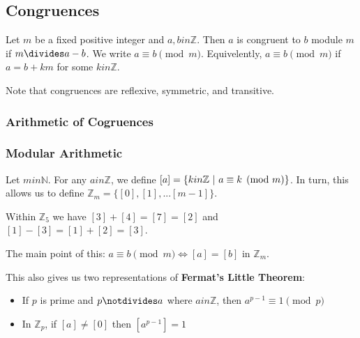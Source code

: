 \documentclass[12pt]{article}
\begin{document}


\subsection*{Congruences}
 Let $m$ be a fixed positive integer and $a,b in \mathbb{Z}$. Then $a$ is congruent to $b$ module $m$ if $m \divides a - b$. We write $a \equiv b \pmod m$. Equivelently, $a \equiv b \pmod m$ if $a = b + km$ for some $k in \mathbb{Z}$.

Note that congruences are reflexive, symmetric, and transitive.

\subsubsection*{Arithmetic of Cogruences}

\subsubsection*{Modular Arithmetic}
 Let $m in \mathbb{N}$. For any $a in \mathbb{Z}$, we define $[a] = \{ k in \mathbb{Z} \ |\  a \equiv k \pmod m \}$. In turn, this allows us to define $\mathbb{Z}_m = \{ [0], [1], ... [m-1] \}$.

Within $\mathbb{Z}_5$ we have $[3] + [4] = [7] = [2]$ and $[1] - [3] = [1] + [2] = [3]$.

The main point of this: $a \equiv b \pmod m \iff [a] = [b]$ in $\mathbb{Z}_m$.

This also gives us two representations of {\bf Fermat's Little Theorem}:
\begin{itemize}
\item If $p$ is prime and $p \notdivides a$ where $a in \mathbb{Z}$, then $a^{p-1} \equiv 1 \pmod p$
\item In $\mathbb{Z}_p$, if $[a] \neq [0]$ then $[a^{p-1}] = 1$
\end{itemize}
\end{document}
